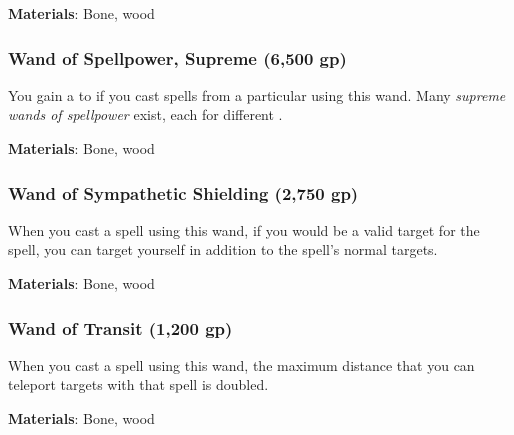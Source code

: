 \vspace{0.25em}
\textbf{Materials}: Bone, wood


\lowercase{\hypertarget{item:Wand of Spellpower, Supreme}{}}\label{item:Wand of Spellpower, Supreme}
\hypertarget{item:Wand of Spellpower, Supreme}{\subsubsection{Wand of Spellpower, Supreme\hfill{} (6,500 gp)}}

You gain a   to  if you cast spells from a particular  using this wand.
Many \textit{supreme wands of spellpower} exist, each for different .



\vspace{0.25em}
\textbf{Materials}: Bone, wood


\lowercase{\hypertarget{item:Wand of Sympathetic Shielding}{}}\label{item:Wand of Sympathetic Shielding}
\hypertarget{item:Wand of Sympathetic Shielding}{\subsubsection{Wand of Sympathetic Shielding\hfill{} (2,750 gp)}}

When you cast a   spell using this wand,
if you would be a valid target for the spell,
you can target yourself in addition to the spell's normal targets.



\vspace{0.25em}
\textbf{Materials}: Bone, wood


\lowercase{\hypertarget{item:Wand of Transit}{}}\label{item:Wand of Transit}
\hypertarget{item:Wand of Transit}{\subsubsection{Wand of Transit\hfill{} (1,200 gp)}}

When you cast a  spell using this wand,
the maximum distance that you can teleport targets with that spell is doubled.



\vspace{0.25em}
\textbf{Materials}: Bone, wood
